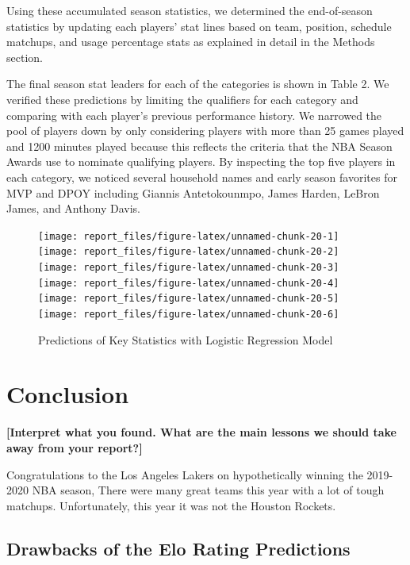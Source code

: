 \documentclass[]{article}
\begin{document}
Using these accumulated season statistics, we determined the
end-of-season statistics by updating each players' stat lines based on
team, position, schedule matchups, and usage percentage stats as
explained in detail in the Methods section.

The final season stat leaders for each of the categories is shown in
Table 2. We verified these predictions by limiting the qualifiers for
each category and comparing with each player's previous performance
history. We narrowed the pool of players down by only considering
players with more than 25 games played and 1200 minutes played because
this reflects the criteria that the NBA Season Awards use to nominate
qualifying players. By inspecting the top five players in each category,
we noticed several household names and early season favorites for MVP
and DPOY including Giannis Antetokounmpo, James Harden, LeBron James,
and Anthony Davis.

\begin{figure}[H]

{\centering \texttt{[image: report\_files/figure-latex/unnamed-chunk-20-1]} \texttt{[image: report\_files/figure-latex/unnamed-chunk-20-2]} \texttt{[image: report\_files/figure-latex/unnamed-chunk-20-3]} \texttt{[image: report\_files/figure-latex/unnamed-chunk-20-4]} \texttt{[image: report\_files/figure-latex/unnamed-chunk-20-5]} \texttt{[image: report\_files/figure-latex/unnamed-chunk-20-6]} 

}

\caption{\label{fig:pred_stat_plots}Predictions of Key Statistics with Logistic Regression Model}\label{fig:unnamed-chunk-20}
\end{figure}

\hypertarget{conclusion}{%
\section{Conclusion}\label{conclusion}}

\textbf{{[}Interpret what you found. What are the main lessons we should
take away from your report?{]}}

Congratulations to the Los Angeles Lakers on hypothetically winning the
2019-2020 NBA season, There were many great teams this year with a lot
of tough matchups. Unfortunately, this year it was not the Houston
Rockets.

\hypertarget{drawbacks-of-the-elo-rating-predictions}{%
\subsection{Drawbacks of the Elo Rating
Predictions}\label{drawbacks-of-the-elo-rating-predictions}}
\end{document}
